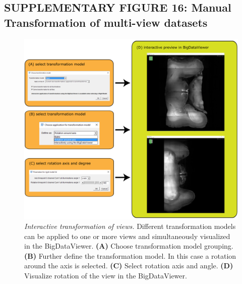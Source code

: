 \documentclass[]{spie}  %
\begin{document}
\subsection*{SUPPLEMENTARY FIGURE 16: Manual Transformation of multi-view datasets}
\vspace{1mm}
\begin{figure}[h!]
\includegraphics[width=\textwidth]{Supp-Transformation.png}
\vspace{-2.0mm}
\caption{\hspace{-0.5mm} \emph{Interactive transformation of views.} Different transformation models can be applied to one or more views and simultaneously visualized in the BigDataViewer. \textbf{(A)} Choose transformation model grouping. \textbf{(B)} Further define the transformation model. In this case a rotation around the axis is selected. \textbf{(C)} Select rotation axis and angle. \textbf{(D)} Visualize rotation of the view in the BigDataViewer.
}
\label{fig:sup-fig-manual-align2}
\end{figure}

\pagebreak
\end{document}
